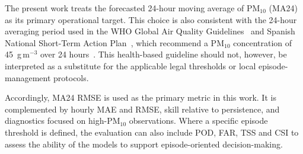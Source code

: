 \documentclass[11pt]{article}
\newenvironment{revnewblock}{%
  \begingroup\color{orange!75!black}%
}{%
  \endgroup%
}
\begin{document}
\begin{revnewblock}
The present work treats the forecasted 24-hour moving average of PM$_{10}$ (MA24) as its primary operational target. This choice is also consistent with the 24-hour averaging period used in the WHO Global Air Quality Guidelines~\cite{WHO} and Spanish National Short-Term Action Plan~\cite{MITECO2021}, which recommend a PM$_{10}$ concentration of 45~\textmu g\,m$^{-3}$ over 24 hours~\cite{WHO}. This health-based guideline should not, however, be interpreted as a substitute for the applicable legal thresholds or local episode-management protocols.

Accordingly, MA24 RMSE is used as the primary metric in this work. It is complemented by hourly MAE and RMSE, skill relative to persistence, and diagnostics focused on high-PM$_{10}$ observations. Where a specific episode threshold is defined, the evaluation can also include POD, FAR, TSS and CSI to assess the ability of the models to support episode-oriented decision-making.
\end{revnewblock}

\end{document}
